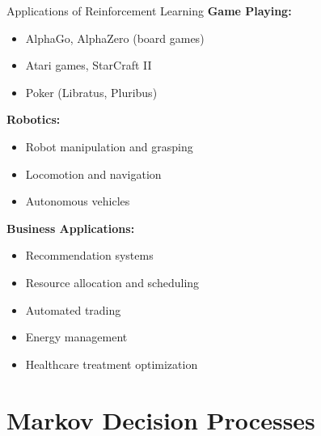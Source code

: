 \documentclass[aspectratio=169]{beamer}
\begin{document}
\begin{frame}{Applications of Reinforcement Learning}
  \textbf{Game Playing:}
  \begin{itemize}
    \item AlphaGo, AlphaZero (board games)
    \item Atari games, StarCraft II
    \item Poker (Libratus, Pluribus)
  \end{itemize}

  \textbf{Robotics:}
  \begin{itemize}
    \item Robot manipulation and grasping
    \item Locomotion and navigation
    \item Autonomous vehicles
  \end{itemize}

  \textbf{Business Applications:}
  \begin{itemize}
    \item Recommendation systems
    \item Resource allocation and scheduling
    \item Automated trading
    \item Energy management
    \item Healthcare treatment optimization
  \end{itemize}
\end{frame}

\section{Markov Decision Processes}
\end{document}
